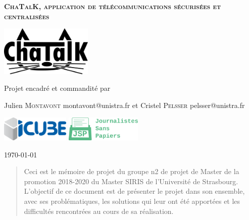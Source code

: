 \documentclass{memoire}
\begin{document}
\begin{center}
  \vfill

  {
  \begin{spacing}{1.4}
  \huge
  \textsc {
  \textbf {
      ChaTalK, application de télécommunications sécurisées et centralisées
  }
  }
  \end{spacing}
  }
  \vfill
  \includegraphics[height=2.4cm]{logos/chatalk.png}
  \vfill

  {\large Projet encadré et commandité par}

  \medskip

  {\large Julien \textsc {Montavont}}
  {\small montavont@unistra.fr}
  et
  {\large Cristel \textsc {Pelsser}}
  {\small pelsser@unistra.fr}

  \medskip

  \includegraphics[height=1.2cm]{logos/icube.png}
  \vfill
  \includegraphics[height=1.2cm]{logos/jsp.png}

  {\small \today}
\end{center}

\cleardoublepage


\tableofcontents
\listoffigures

\cleardoublepage

\begin{abstract}
  Ceci est le mémoire de projet du groupe n2 de projet de Master de la promotion 2018-2020 du Master SIRIS de l'Université de Strasbourg.
\newline
L'objectif de ce document est de présenter le projet dans son ensemble, avec ses problématiques, les solutions qui leur ont été apportées et les difficultés rencontrées au cours de sa réalisation.
\end{abstract}
\end{document}
